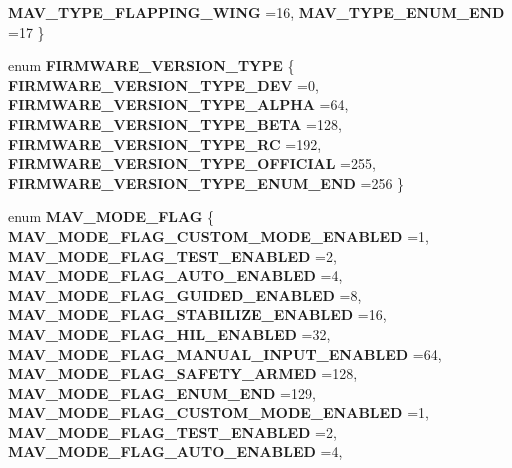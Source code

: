 \begin{DoxyCompactItemize}
\textbf{ M\+A\+V\+\_\+\+T\+Y\+P\+E\+\_\+\+F\+L\+A\+P\+P\+I\+N\+G\+\_\+\+W\+I\+NG} =16, 
\textbf{ M\+A\+V\+\_\+\+T\+Y\+P\+E\+\_\+\+E\+N\+U\+M\+\_\+\+E\+ND} =17
 \}
\item 
enum \textbf{ F\+I\+R\+M\+W\+A\+R\+E\+\_\+\+V\+E\+R\+S\+I\+O\+N\+\_\+\+T\+Y\+PE} \{ \newline
\textbf{ F\+I\+R\+M\+W\+A\+R\+E\+\_\+\+V\+E\+R\+S\+I\+O\+N\+\_\+\+T\+Y\+P\+E\+\_\+\+D\+EV} =0, 
\textbf{ F\+I\+R\+M\+W\+A\+R\+E\+\_\+\+V\+E\+R\+S\+I\+O\+N\+\_\+\+T\+Y\+P\+E\+\_\+\+A\+L\+P\+HA} =64, 
\textbf{ F\+I\+R\+M\+W\+A\+R\+E\+\_\+\+V\+E\+R\+S\+I\+O\+N\+\_\+\+T\+Y\+P\+E\+\_\+\+B\+E\+TA} =128, 
\textbf{ F\+I\+R\+M\+W\+A\+R\+E\+\_\+\+V\+E\+R\+S\+I\+O\+N\+\_\+\+T\+Y\+P\+E\+\_\+\+RC} =192, 
\newline
\textbf{ F\+I\+R\+M\+W\+A\+R\+E\+\_\+\+V\+E\+R\+S\+I\+O\+N\+\_\+\+T\+Y\+P\+E\+\_\+\+O\+F\+F\+I\+C\+I\+AL} =255, 
\textbf{ F\+I\+R\+M\+W\+A\+R\+E\+\_\+\+V\+E\+R\+S\+I\+O\+N\+\_\+\+T\+Y\+P\+E\+\_\+\+E\+N\+U\+M\+\_\+\+E\+ND} =256
 \}
\item 
enum \textbf{ M\+A\+V\+\_\+\+M\+O\+D\+E\+\_\+\+F\+L\+AG} \{ \newline
\textbf{ M\+A\+V\+\_\+\+M\+O\+D\+E\+\_\+\+F\+L\+A\+G\+\_\+\+C\+U\+S\+T\+O\+M\+\_\+\+M\+O\+D\+E\+\_\+\+E\+N\+A\+B\+L\+ED} =1, 
\textbf{ M\+A\+V\+\_\+\+M\+O\+D\+E\+\_\+\+F\+L\+A\+G\+\_\+\+T\+E\+S\+T\+\_\+\+E\+N\+A\+B\+L\+ED} =2, 
\textbf{ M\+A\+V\+\_\+\+M\+O\+D\+E\+\_\+\+F\+L\+A\+G\+\_\+\+A\+U\+T\+O\+\_\+\+E\+N\+A\+B\+L\+ED} =4, 
\textbf{ M\+A\+V\+\_\+\+M\+O\+D\+E\+\_\+\+F\+L\+A\+G\+\_\+\+G\+U\+I\+D\+E\+D\+\_\+\+E\+N\+A\+B\+L\+ED} =8, 
\newline
\textbf{ M\+A\+V\+\_\+\+M\+O\+D\+E\+\_\+\+F\+L\+A\+G\+\_\+\+S\+T\+A\+B\+I\+L\+I\+Z\+E\+\_\+\+E\+N\+A\+B\+L\+ED} =16, 
\textbf{ M\+A\+V\+\_\+\+M\+O\+D\+E\+\_\+\+F\+L\+A\+G\+\_\+\+H\+I\+L\+\_\+\+E\+N\+A\+B\+L\+ED} =32, 
\textbf{ M\+A\+V\+\_\+\+M\+O\+D\+E\+\_\+\+F\+L\+A\+G\+\_\+\+M\+A\+N\+U\+A\+L\+\_\+\+I\+N\+P\+U\+T\+\_\+\+E\+N\+A\+B\+L\+ED} =64, 
\textbf{ M\+A\+V\+\_\+\+M\+O\+D\+E\+\_\+\+F\+L\+A\+G\+\_\+\+S\+A\+F\+E\+T\+Y\+\_\+\+A\+R\+M\+ED} =128, 
\newline
\textbf{ M\+A\+V\+\_\+\+M\+O\+D\+E\+\_\+\+F\+L\+A\+G\+\_\+\+E\+N\+U\+M\+\_\+\+E\+ND} =129, 
\textbf{ M\+A\+V\+\_\+\+M\+O\+D\+E\+\_\+\+F\+L\+A\+G\+\_\+\+C\+U\+S\+T\+O\+M\+\_\+\+M\+O\+D\+E\+\_\+\+E\+N\+A\+B\+L\+ED} =1, 
\textbf{ M\+A\+V\+\_\+\+M\+O\+D\+E\+\_\+\+F\+L\+A\+G\+\_\+\+T\+E\+S\+T\+\_\+\+E\+N\+A\+B\+L\+ED} =2, 
\textbf{ M\+A\+V\+\_\+\+M\+O\+D\+E\+\_\+\+F\+L\+A\+G\+\_\+\+A\+U\+T\+O\+\_\+\+E\+N\+A\+B\+L\+ED} =4, 
\newline

\end{DoxyCompactItemize}

